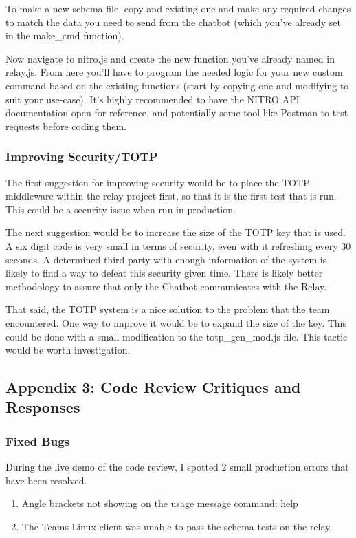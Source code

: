 \documentclass[onecolumn, draftclsnofoot,10pt, compsoc]{IEEEtran}
\begin{document}
    To make a new schema file, copy and existing one and make any required changes to match the data you need to send from the chatbot (which you've already set in the make\_cmd function).
    
    Now navigate to nitro.js and create the new function you've already named in relay.js.
    From here you'll have to program the needed logic for your new custom command based on the existing functions (start by copying one and modifying to suit your use-case).
    It's highly recommended to have the NITRO API documentation open for reference, and potentially some tool like Postman to test requests before coding them.

\subsubsection{Improving Security/TOTP}
    The first suggestion for improving security would be to place the TOTP middleware within the relay project first, so that it is the first test that is run. This could be a security issue when run in production.
    
    The next suggestion would be to increase the size of the TOTP key that is used.
    A six digit code is very small in terms of security, even with it refreshing every 30 seconds.
    A determined third party with enough information of the system is likely to find a way to defeat this security given time.
    There is likely better methodology to assure that only the Chatbot communicates with the Relay.
    
    That said, the TOTP system is a nice solution to the problem that the team encountered.
    One way to improve it would be to expand the size of the key.
    This could be done with a small modification to the totp\_gen\_mod.js file.
    This tactic would be worth investigation.

\subsection{Appendix 3: Code Review Critiques and Responses}
\subsubsection{Fixed Bugs}
During the live demo of the code review, I spotted 2 small production errors that have been resolved.
\begin{enumerate}
    \item Angle brackets not showing on the usage message command: help
    \item The Teams Linux client was unable to pass the schema tests on the relay.
\end{enumerate}
\end{document}
